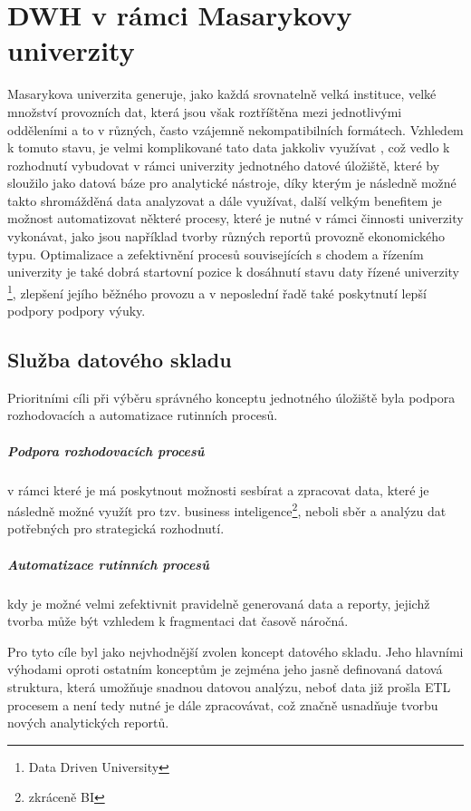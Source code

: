 \documentclass[
  digital,     %
  twoside,     %
  lof,         %
  lot,         %
]{fithesis4}
\begin{document}
\chapter{DWH v rámci Masarykovy univerzity}
Masarykova univerzita generuje, jako každá srovnatelně velká instituce, velké množství provozních dat, která jsou však roztříštěna mezi jednotlivými odděleními a to v různých, často vzájemně nekompatibilních formátech. Vzhledem k tomuto stavu, je velmi komplikované tato data jakkoliv využívat , což vedlo k rozhodnutí  vybudovat v rámci univerzity jednotného datové úložiště, které by sloužilo jako datová báze pro analytické nástroje, díky kterým je následně možné takto shromážděná data analyzovat a dále využívat, další velkým benefitem je možnost automatizovat některé procesy, které je nutné v rámci činnosti univerzity vykonávat, jako jsou například tvorby různých reportů provozně ekonomického typu. Optimalizace a zefektivnění procesů souvisejících s chodem a řízením univerzity je také dobrá startovní pozice k dosáhnutí stavu daty řízené univerzity \footnote{Data Driven University}, zlepšení jejího běžného provozu a v neposlední řadě také poskytnutí lepší podpory podpory výuky.

\section{Služba datového skladu}
Prioritními cíli při výběru správného konceptu jednotného úložiště byla podpora rozhodovacích a automatizace rutinních procesů. 
\paragraph{Podpora rozhodovacích procesů} v rámci které je má poskytnout možnosti sesbírat a zpracovat data, které je následně možné využít pro tzv. business inteligence\footnote{zkráceně BI}, neboli sběr a analýzu dat potřebných pro strategická rozhodnutí.
\paragraph{Automatizace rutinních procesů} kdy je možné velmi zefektivnit pravidelně generovaná data a reporty, jejichž tvorba může být vzhledem k fragmentaci dat časově náročná. 

Pro tyto cíle byl jako nejvhodnější zvolen koncept datového skladu. Jeho hlavními výhodami oproti ostatním konceptům je zejména jeho jasně definovaná datová struktura, která umožňuje snadnou datovou analýzu, neboť data již prošla ETL procesem a není tedy nutné je dále zpracovávat, což značně usnadňuje tvorbu nových analytických reportů.
\end{document}
